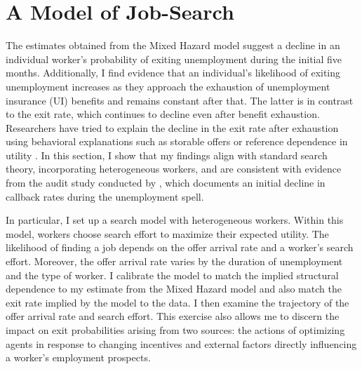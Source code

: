 \documentclass{div}
\begin{document}

\section{A Model of Job-Search}\label{sec_search_model}

The estimates obtained from the Mixed Hazard model suggest a decline in an individual worker's probability of exiting unemployment during the initial five months. Additionally, I find evidence that an individual's likelihood of exiting unemployment increases as they approach the exhaustion of unemployment insurance (UI) benefits and remains constant after that. The latter is in contrast to the exit rate, which continues to decline even after benefit exhaustion.  Researchers have tried to explain the decline in the exit rate after exhaustion using behavioral explanations such as storable offers \citep{BoonevanOurs2012} or reference dependence in utility \citep{DellaVignaEtAl2021}. In this section, I show that my findings align with standard search theory, incorporating heterogeneous workers, and are consistent with evidence from the audit study conducted by \cite{KroftEtAl2013}, which documents an initial decline in callback rates during the unemployment spell. 

In particular, I set up a search model with heterogeneous workers. Within this model, workers choose search effort to maximize their expected utility. The likelihood of finding a job depends on the offer arrival rate and a worker's search effort. Moreover, the offer arrival rate varies by the duration of unemployment and the type of worker. I calibrate the model to match the implied structural dependence to my estimate from the Mixed Hazard model and also match the exit rate implied by the model to the data. I then examine the trajectory of the offer arrival rate and search effort. This exercise also allows me to discern the impact on exit probabilities arising from two sources: the actions of optimizing agents in response to changing incentives and external factors directly influencing a worker's employment prospects. 

\end{document}

